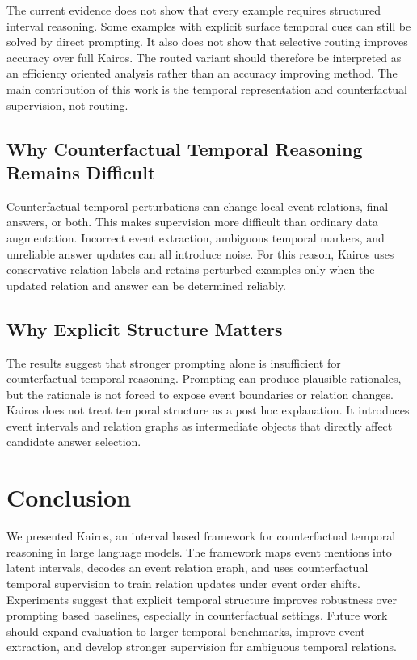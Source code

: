 \documentclass[11pt]{article}
\newcommand{\method}{Kairos}
\begin{document}
The current evidence does not show that every example requires structured interval reasoning. Some examples with explicit surface temporal cues can still be solved by direct prompting. It also does not show that selective routing improves accuracy over full \method. The routed variant should therefore be interpreted as an efficiency oriented analysis rather than an accuracy improving method. The main contribution of this work is the temporal representation and counterfactual supervision, not routing.

\subsection{Why Counterfactual Temporal Reasoning Remains Difficult}

Counterfactual temporal perturbations can change local event relations, final answers, or both. This makes supervision more difficult than ordinary data augmentation. Incorrect event extraction, ambiguous temporal markers, and unreliable answer updates can all introduce noise. For this reason, \method{} uses conservative relation labels and retains perturbed examples only when the updated relation and answer can be determined reliably.

\subsection{Why Explicit Structure Matters}

The results suggest that stronger prompting alone is insufficient for counterfactual temporal reasoning. Prompting can produce plausible rationales, but the rationale is not forced to expose event boundaries or relation changes. \method{} does not treat temporal structure as a post hoc explanation. It introduces event intervals and relation graphs as intermediate objects that directly affect candidate answer selection.

\section{Conclusion}

We presented \method, an interval based framework for counterfactual temporal reasoning in large language models. The framework maps event mentions into latent intervals, decodes an event relation graph, and uses counterfactual temporal supervision to train relation updates under event order shifts. Experiments suggest that explicit temporal structure improves robustness over prompting based baselines, especially in counterfactual settings. Future work should expand evaluation to larger temporal benchmarks, improve event extraction, and develop stronger supervision for ambiguous temporal relations.
\end{document}
